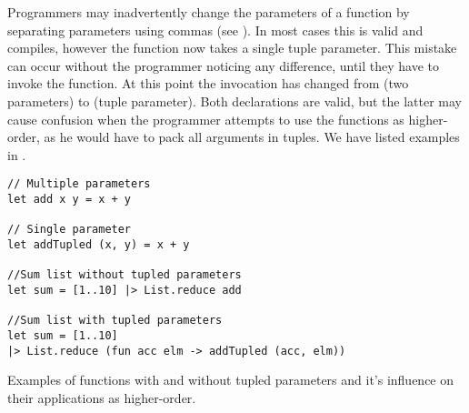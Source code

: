 Programmers may inadvertently change the parameters of a function by separating parameters using commas (see ). In most cases this is valid \fs and compiles, however the function now takes a single tuple parameter. This mistake can occur without the programmer noticing any difference, until they have to invoke the function. At this point the invocation has changed from (two parameters) to (tuple parameter). Both declarations are valid, but the latter may cause confusion when the programmer attempts to use the functions as higher-order, as he would have to pack all arguments in tuples. We have listed examples in .

\begin{listing}[H]
\begin{verbatim}
// Multiple parameters
let add x y = x + y

// Single parameter
let addTupled (x, y) = x + y

//Sum list without tupled parameters
let sum = [1..10] |> List.reduce add

//Sum list with tupled parameters
let sum = [1..10] 
|> List.reduce (fun acc elm -> addTupled (acc, elm)) 
\end{verbatim}
\caption{Examples of functions with and without tupled parameters and it's influence on their applications as higher-order.}
\label{lst:para-err}
\end{listing}
